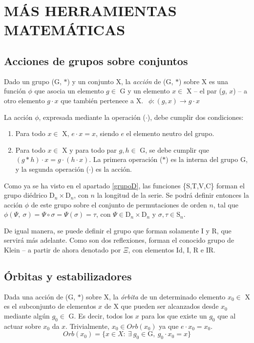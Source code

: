 	\chapter{MÁS HERRAMIENTAS MATEMÁTICAS}	
	\section{Acciones de grupos sobre conjuntos}
		Dado un grupo (G, $*$) y un conjunto X, la \emph{acción} de (G, $*$) sobre X es una función $\phi$ que asocia un elemento $g \in$ G y un elemento $x \in$ X -- el par ($g$, $x$) -- a otro elemento $g\cdot x$ que también pertenece a X. $\ \ \phi :(g,x) \to g\cdot x$
	
		La acción $\phi$, expresada mediante la operación ($\cdot$), debe cumplir dos condiciones:
		\begin{enumerate}
			\item{Para todo $x\in$ X, $e\cdot x=x$, siendo $e$ el elemento neutro del grupo.}
		
			\item{Para todo $x\in$ X y para todo par $g,h\in$ G, se debe cumplir que $(g*h)\cdot x=g\cdot (h\cdot x)$. La primera operación ($*$) es la interna del grupo G, y la segunda operación ($\cdot$) es la acción.}
		\end{enumerate}
		Como ya se ha visto en el apartado \ref{grupoD}, las funciones \{S,T,V,C\} forman el grupo diédrico $\text{D}_{n}\times\text{D}_{n}$, con $n$ la longitud de la serie. Se podrá definir entonces la acción $\phi$ de este grupo sobre el conjunto de permutaciones de orden $n$, tal que $\phi(\Psi,\ \sigma)=\Psi\circ\sigma=\Psi(\sigma)=\tau$, con $\Psi\in\text{D}_{n}\times\text{D}_{n}$ y $\sigma,\tau\in\text{S}_n$.
		
		De igual manera, se puede definir el grupo que forman solamente I y R, que servirá más adelante. Como son dos reflexiones, forman el conocido grupo de Klein -- a partir de ahora denotado por $\Xi$, con elementos Id, I, R e IR.

	\section{Órbitas y estabilizadores}	
		Dada una acción de (G, $*$) sobre X, la \emph{órbita} de un determinado elemento $x_0\in$ X es el subconjunto de elementos $x$ de X que pueden ser alcanzados desde $x_0$ mediante algún $g_0\in$ G. Es decir, todos los $x$ para los que existe un $g_0$ que al actuar sobre $x_0$ da $x$. Trivialmente, $x_0\in Orb(x_0)$ ya que $e\cdot x_0=x_0$.
		\[Orb(x_0)=\{x\in X :\ \exists \ g_0\in \text{G},\ g_0\cdot x_0 =x\}\]
	
